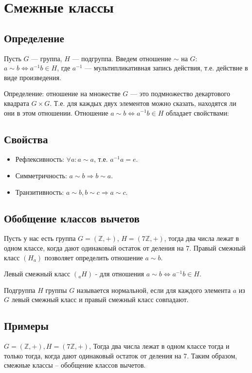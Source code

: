 \documentclass[12pt]{article}
\begin{document}
\section{Смежные классы}
\subsection{Определение}
Пусть $G$ --- группа, $H$ --- подгруппа. Введем отношение $\sim$ на $G$: $a\sim b \Leftrightarrow a^{-1}b\in H$, где $a^{-1}$ ---
мультипликативная запись действия, т.е. действие в виде произведения.

Определение: отношение на множестве $G$ --- это подмножество декартового квадрата $G\times G$. Т.е. для каждых двух элементов можно сказать, находятся ли они в этом отношении. Отношение $a\sim b \Leftrightarrow a^{-1}b\in H$ обладает свойствами:

\subsection{Свойства}
\begin{itemize}
    \item Рефлексивность: $\forall a: a\sim a$, т.е. $a^{-1}a=e$.
    \item Симметричность: $a\sim b \Rightarrow b\sim a$.
    \item Транзитивность: $a\sim b, b\sim c \Rightarrow a\sim c$. \end{itemize}
\subsection{Обобщение классов вычетов}
Пусть у нас есть группа $G=(\mathbb{Z},+)$, $H=(7\mathbb{Z},+)$, тогда два числа лежат в одном классе, когда дают одинаковый остаток от деления на 7. Правый смежный класс $(H_a)$ позволяет определить отношение $a\sim b$.

Левый смежный класс $({}_aH)$ - для отношения $a\sim b \Leftrightarrow a^{-1}b\in H$.

Подгруппа $H$ группы $G$ называется нормальной, если для каждого элемента $a$ из $G$ левый смежный класс и правый смежный класс совпадают.

\subsection{Примеры} $G = (\mathbb{Z}, +), H= (7\mathbb{Z}, +)$, Тогда два числа лежат в одном классе тогда и только тогда, когда дают одинаковый остаток от деления на 7. Таким образом, смежные классы – обобщение классов вычетов.
\end{document}
